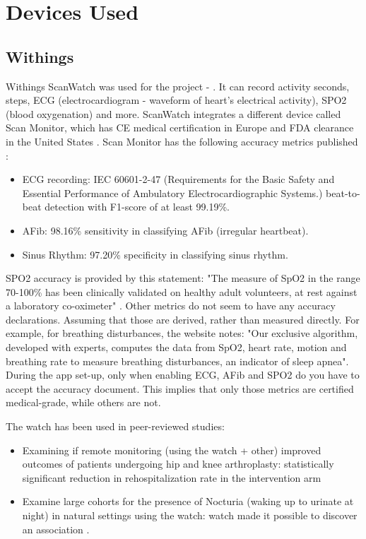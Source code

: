 \section{Devices Used}
\subsection{Withings}
\label{section:WithingsWatch}
Withings ScanWatch was used for the project - \cite{withingsStorePage}. It can record activity seconds, steps, ECG (electrocardiogram - waveform of heart's electrical activity), SPO2 (blood oxygenation) and more. ScanWatch integrates a different device called Scan Monitor, which has CE medical certification in Europe and FDA clearance in the United States \cite{withingsStorePage}.  Scan Monitor has the following accuracy metrics published \cite{scanMonitor}:
\begin{itemize}
    \item ECG recording: IEC 60601-2-47 (Requirements for the Basic Safety and Essential Performance of Ambulatory Electrocardiographic Systems.) beat-to-beat detection with F1-score of at least 99.19\%.
    \item AFib: 98.16\% sensitivity in classifying AFib (irregular heartbeat).
    \item Sinus Rhythm: 97.20\% specificity in classifying sinus rhythm.
\end{itemize}
SPO2 accuracy is provided by this statement: "The measure of SpO2 in the range 70-100\% has been clinically validated on healthy adult volunteers, at rest against a laboratory co-oximeter" \cite{scanMonitor}.
Other metrics do not seem to have any accuracy declarations. Assuming that those are derived, rather than measured directly. For example, for breathing disturbances, the website notes: "Our exclusive algorithm, developed with experts, computes the data from SpO2, heart rate, motion and breathing rate to measure breathing disturbances, an indicator of sleep apnea". During the app set-up, only when enabling ECG, AFib and SPO2 do you have to accept the accuracy document. This implies that only those metrics are certified medical-grade, while others are not.

The watch has been used in peer-reviewed studies:
\begin{itemize}
    \item Examining if remote monitoring (using the watch + other) improved outcomes of patients undergoing hip and knee arthroplasty: statistically significant reduction in rehospitalization rate in the intervention arm \cite{withingsHospitalization}
    \item Examine large cohorts for the presence of Nocturia (waking up to urinate at night) in natural settings using the watch: watch made it possible to discover an association \cite{withingsNocturia}.
\end{itemize}



